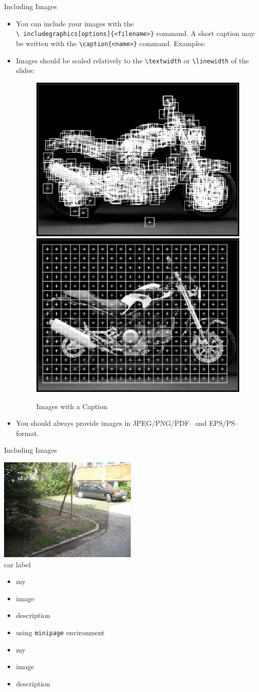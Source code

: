 \documentclass[xcolor=table,mathserif,9pt]{beamer}    %
\begin{document}
\begin{frame}{Including Images}
\begin{itemize}
\item[] You can include your images with the \\ \texttt{\textbackslash
    includegraphics[options]\{<filename>\}} command. A short caption may be
  written with the \texttt{\textbackslash caption\{<name>\}} command. Examples:
\item[] Images should be scaled relatively to the \texttt{\textbackslash textwidth} or \texttt{\textbackslash linewidth} of the slides:
  \begin{center}
  \begin{figure}
      \includegraphics[width=.15\textwidth]{images/salientpoints}
    \includegraphics[width=.15\linewidth]{images/grid}
    \caption{Images with a Caption}
  \end{figure}
  \end{center}
\item[] You should always provide images in JPEG/PNG/PDF-- \alert{and}
  EPS/PS--format.
\end{itemize}
\end{frame}

\begin{frame}{Including Images}
\begin{minipage}[b]{.4\linewidth}
  \begin{center}
    \includegraphics[width=.5\linewidth]{images/car}\\
    car label
  \end{center}
\end{minipage}
\begin{minipage}[b]{.4\linewidth}
  \begin{itemize}
  \item my
  \item image
  \item description
  \item using \texttt{minipage} environment
  \item my
  \item image
  \item description
  \end{itemize}
\end{minipage}
\end{frame}
\end{document}
